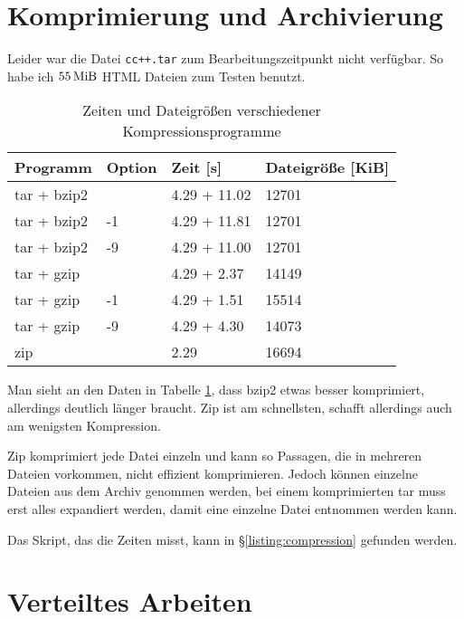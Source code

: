 


\section{Komprimierung und Archivierung}

Leider war die Datei \texttt{cc++.tar} zum Bearbeitungszeitpunkt nicht verfügbar. So habe ich $\unit[55]{MiB}$ HTML Dateien zum Testen benutzt.

\begin{table}[h!]
\begin{center}
\begin{tabular}{llll}
Programm & Option & Zeit [s] & Dateigröße [KiB] \\
\hline
tar + bzip2 &  & 4.29 + 11.02 & 12701 \\
tar + bzip2 & -1 & 4.29 + 11.81 & 12701 \\
tar + bzip2 & -9 & 4.29 + 11.00 & 12701 \\
tar + gzip &  & 4.29 + 2.37 & 14149 \\
tar + gzip & -1 & 4.29 + 1.51 & 15514 \\
tar + gzip & -9 & 4.29 + 4.30 & 14073 \\
zip &  & 2.29 & 16694\\
\end{tabular}
\end{center}
\caption{Zeiten und Dateigrößen verschiedener Kompressionsprogramme}
\label{table:compression-results}
\end{table}

Man sieht an den Daten in Tabelle \ref{table:compression-results}, dass bzip2 etwas besser komprimiert, allerdings deutlich länger braucht. Zip ist am schnellsten, schafft allerdings auch am wenigsten Kompression.

Zip komprimiert jede Datei einzeln und kann so Passagen, die in mehreren Dateien vorkommen, nicht effizient komprimieren. Jedoch können einzelne Dateien aus dem Archiv genommen werden, bei einem komprimierten tar muss erst alles expandiert werden, damit eine einzelne Datei entnommen werden kann.

Das Skript, das die Zeiten misst, kann in §\ref{listing:compression} gefunden werden.


\section{Verteiltes Arbeiten}

